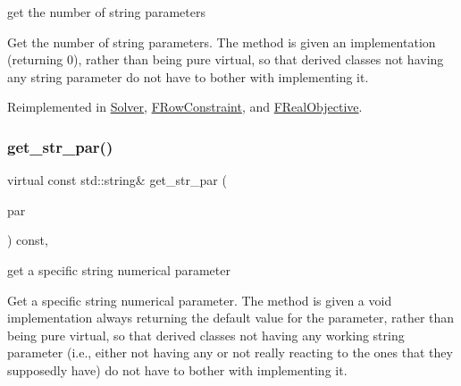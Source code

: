 get the number of string parameters 

Get the number of string parameters. The method is given an implementation (returning 0), rather than being pure virtual, so that derived classes not having any string parameter do not have to bother with implementing it. 

Reimplemented in \mbox{\hyperlink{class_s_m_spp__di__unipi__it_1_1_solver_a91f0341f09d59b3023fc95122a625125}{Solver}}, \mbox{\hyperlink{class_s_m_spp__di__unipi__it_1_1_f_row_constraint_a91f0341f09d59b3023fc95122a625125}{F\+Row\+Constraint}}, and \mbox{\hyperlink{class_s_m_spp__di__unipi__it_1_1_f_real_objective_a91f0341f09d59b3023fc95122a625125}{F\+Real\+Objective}}.

\mbox{\label{class_s_m_spp__di__unipi__it_1_1_thin_compute_interface_abdd41940763ebff749e5f16e6ea310c6}} 
\subsubsection{\texorpdfstring{get\+\_\+str\+\_\+par()}{get\_str\_par()}}
{\footnotesize\ttfamily virtual const std\+::string\& get\+\_\+str\+\_\+par (\begin{DoxyParamCaption}\item[{const \mbox{\hyperlink{class_s_m_spp__di__unipi__it_1_1_thin_compute_interface_aa3d710629ad8c434286726ad810c3b47}{idx\+\_\+type}}}]{par }\end{DoxyParamCaption}) const\hspace{0.3cm}{\ttfamily [inline]}, {\ttfamily [virtual]}}



get a specific string numerical parameter 

Get a specific string numerical parameter. The method is given a void implementation always returning the default value for the parameter, rather than being pure virtual, so that derived classes not having any working string parameter (i.\+e., either not having any or not really reacting to the ones that they supposedly have) do not have to bother with implementing it. 

